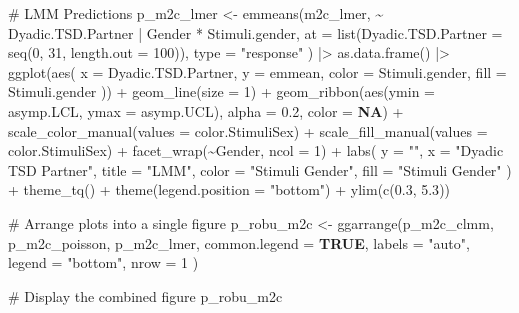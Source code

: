 \documentclass[
  bookmarksnumbered]{article}
\newenvironment{Shaded}{\begin{snugshade}}{\end{snugshade}}
\newcommand{\AttributeTok}[1]{\textcolor[rgb]{0.80,0.80,0.80}{#1}}
\newcommand{\CommentTok}[1]{\textcolor[rgb]{0.50,0.62,0.50}{#1}}
\newcommand{\ConstantTok}[1]{\textcolor[rgb]{0.86,0.64,0.64}{\textbf{#1}}}
\newcommand{\DecValTok}[1]{\textcolor[rgb]{0.86,0.86,0.80}{#1}}
\newcommand{\FloatTok}[1]{\textcolor[rgb]{0.75,0.75,0.82}{#1}}
\newcommand{\FunctionTok}[1]{\textcolor[rgb]{0.94,0.94,0.56}{#1}}
\newcommand{\NormalTok}[1]{\textcolor[rgb]{0.80,0.80,0.80}{#1}}
\newcommand{\OtherTok}[1]{\textcolor[rgb]{0.94,0.94,0.56}{#1}}
\newcommand{\SpecialCharTok}[1]{\textcolor[rgb]{0.86,0.64,0.64}{#1}}
\newcommand{\StringTok}[1]{\textcolor[rgb]{0.80,0.58,0.58}{#1}}
\begin{document}
\begin{Shaded}
\begin{Highlighting}[]
\CommentTok{\# LMM Predictions}
\NormalTok{p\_m2c\_lmer }\OtherTok{\textless{}{-}} \FunctionTok{emmeans}\NormalTok{(m2c\_lmer, }\SpecialCharTok{\textasciitilde{}}\NormalTok{ Dyadic.TSD.Partner }\SpecialCharTok{|}\NormalTok{ Gender }\SpecialCharTok{*}\NormalTok{ Stimuli.gender,}
  \AttributeTok{at =} \FunctionTok{list}\NormalTok{(}\AttributeTok{Dyadic.TSD.Partner =} \FunctionTok{seq}\NormalTok{(}\DecValTok{0}\NormalTok{, }\DecValTok{31}\NormalTok{, }\AttributeTok{length.out =} \DecValTok{100}\NormalTok{)),}
  \AttributeTok{type =} \StringTok{"response"}
\NormalTok{) }\SpecialCharTok{|\textgreater{}}
  \FunctionTok{as.data.frame}\NormalTok{() }\SpecialCharTok{|\textgreater{}}
  \FunctionTok{ggplot}\NormalTok{(}\FunctionTok{aes}\NormalTok{(}
    \AttributeTok{x =}\NormalTok{ Dyadic.TSD.Partner, }\AttributeTok{y =}\NormalTok{ emmean,}
    \AttributeTok{color =}\NormalTok{ Stimuli.gender, }\AttributeTok{fill =}\NormalTok{ Stimuli.gender}
\NormalTok{  )) }\SpecialCharTok{+}
  \FunctionTok{geom\_line}\NormalTok{(}\AttributeTok{size =} \DecValTok{1}\NormalTok{) }\SpecialCharTok{+}
  \FunctionTok{geom\_ribbon}\NormalTok{(}\FunctionTok{aes}\NormalTok{(}\AttributeTok{ymin =}\NormalTok{ asymp.LCL, }\AttributeTok{ymax =}\NormalTok{ asymp.UCL), }\AttributeTok{alpha =} \FloatTok{0.2}\NormalTok{, }\AttributeTok{color =} \ConstantTok{NA}\NormalTok{) }\SpecialCharTok{+}
  \FunctionTok{scale\_color\_manual}\NormalTok{(}\AttributeTok{values =}\NormalTok{ color.StimuliSex) }\SpecialCharTok{+}
  \FunctionTok{scale\_fill\_manual}\NormalTok{(}\AttributeTok{values =}\NormalTok{ color.StimuliSex) }\SpecialCharTok{+}
  \FunctionTok{facet\_wrap}\NormalTok{(}\SpecialCharTok{\textasciitilde{}}\NormalTok{Gender, }\AttributeTok{ncol =} \DecValTok{1}\NormalTok{) }\SpecialCharTok{+}
  \FunctionTok{labs}\NormalTok{(}
    \AttributeTok{y =} \StringTok{""}\NormalTok{, }\AttributeTok{x =} \StringTok{"Dyadic TSD Partner"}\NormalTok{,}
    \AttributeTok{title =} \StringTok{"LMM"}\NormalTok{,}
    \AttributeTok{color =} \StringTok{"Stimuli Gender"}\NormalTok{, }\AttributeTok{fill =} \StringTok{"Stimuli Gender"}
\NormalTok{  ) }\SpecialCharTok{+}
  \FunctionTok{theme\_tq}\NormalTok{() }\SpecialCharTok{+}
  \FunctionTok{theme}\NormalTok{(}\AttributeTok{legend.position =} \StringTok{"bottom"}\NormalTok{) }\SpecialCharTok{+}
  \FunctionTok{ylim}\NormalTok{(}\FunctionTok{c}\NormalTok{(}\FloatTok{0.3}\NormalTok{, }\FloatTok{5.3}\NormalTok{))}

\CommentTok{\# Arrange plots into a single figure}
\NormalTok{p\_robu\_m2c }\OtherTok{\textless{}{-}} \FunctionTok{ggarrange}\NormalTok{(p\_m2c\_clmm, p\_m2c\_poisson, p\_m2c\_lmer,}
  \AttributeTok{common.legend =} \ConstantTok{TRUE}\NormalTok{, }\AttributeTok{labels =} \StringTok{"auto"}\NormalTok{, }\AttributeTok{legend =} \StringTok{"bottom"}\NormalTok{, }\AttributeTok{nrow =} \DecValTok{1}
\NormalTok{)}

\CommentTok{\# Display the combined figure}
\NormalTok{p\_robu\_m2c}
\end{Highlighting}
\end{Shaded}
\end{document}
